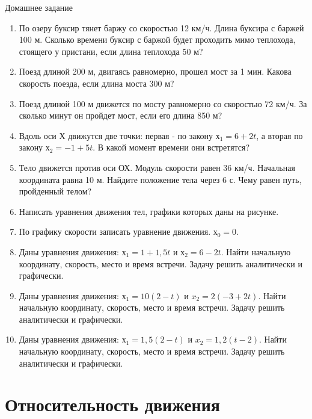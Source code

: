 \documentclass[a6paper, 11pt]{diss_4}
\renewcommand{\'}{\,'}
\begin{document}
\begin{center}
   Домашнее задание
\end{center}
\begin{enumerate}
\item По озеру буксир тянет баржу со скоростью 12 км/ч. Длина буксира с баржей
100 м. Сколько времени буксир с баржой будет проходить мимо теплохода, стоящего
у пристани, если длина теплохода 50 м?

\item Поезд длиной 200 м, двигаясь равномерно, прошел мост за 1 мин. Какова
скорость поезда, если длина моста 300 м?

\item Поезд длиной 100 м движется по мосту равномерно со скоростью 72 км/ч. За
сколько минут он пройдет мост, если его длина 850 м?

\item Вдоль оси Х движутся две точки: первая - по закону $х_1 = 6 + 2t$, а
 вторая по закону $х_2 = -1 + 5t$. В какой момент времени они встретятся?

\item Тело движется против оси ОХ. Модуль скорости равен 36 км/ч. Начальная
координата равна 10 м. Найдите положение тела через 6 с. Чему равен путь, пройденный телом?

\item Написать уравнения движения тел, графики которых даны на рисунке.

\item По графику скорости записать уравнение движения. $х_0=0$.

\item Даны уравнения движения: $х_1= 1+1,5t$ и $х_2= 6- 2t$. Найти начальную
 координату, скорость, место и время встречи. Задачу решить аналитически и
 графически.

\item Даны уравнения движения: $х_1 = 10(2-t)$ и $x_2=2(-3+2t)$. Найти
начальную координату, скорость, место и время встречи. Задачу решить
аналитически и графически.

\item Даны уравнения движения: $х_1 = 1,5(2-t)$ и $x_2 = 1,2(t -2)$. Найти
начальную координату, скорость, место и время встречи. Задачу решить
аналитически и графически.
\end{enumerate}

\section{Относительность движения}
\end{document}
